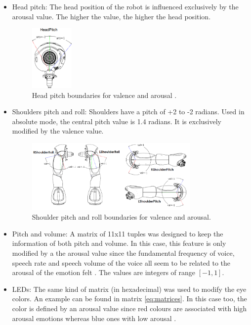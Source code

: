 \begin{itemize}
\item Head pitch: The head position of the robot is influenced exclusively by the arousal value. The higher the value, the higher the head position.

\begin{figure}[h!]
        \centering
        \includegraphics[width=0.2\textwidth]{figures/head.png}
        \caption{Head pitch boundaries for valence and arousal \cite{aldebaran}.}
        \label{fig:head}
\end{figure}

\item Shoulders pitch and roll: Shoulders have a pitch of +2 to -2 radians. Used in absolute mode, the central pitch value is 1.4 radians. It is exclusively modified by the valence value.

\begin{figure}[h!]
        \centering
        \includegraphics[width=0.8\textwidth]{figures/parts.png}
        \caption{Shoulder pitch and roll boundaries \cite{aldebaran} for valence and arousal.}
        \label{fig:parts}
\end{figure}

\item Pitch and volume: A matrix of 11x11 tuples was designed to keep the information of both pitch and volume. In this case, this feature is only modified by a the arousal value since the fundamental frequency of voice, speech rate and speech volume of the voice all seem to be related to the arousal of the emotion felt \cite{banse1996acoustic}. The values are integers of range $ [-1,1] $. 
\item LEDs: The same kind of matrix (in hexadecimal) was used to modify the eye colors. An example can be found in matrix \ref{eq:matrices}. In this case too, the color is defined by an arousal value since red colours are associated with high arousal emotions whereas blue ones with low arousal \cite{elliot2014color}.

\vspace{0.5cm}

\end{itemize}
